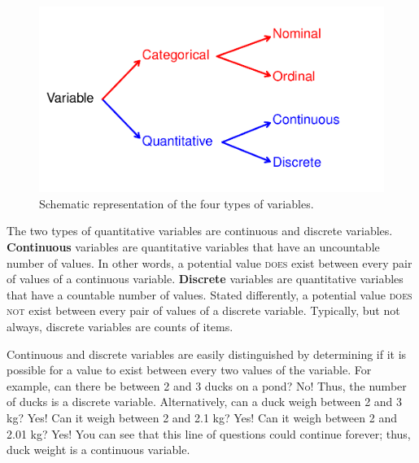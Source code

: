 \documentclass[10pt,openany]{book}\usepackage[]{graphicx}\usepackage[]{color}
\newenvironment{knitrout}{}{} %
\begin{document}
\begin{knitrout}
\color{fgcolor}\begin{figure}[hbtp]

{\centering \includegraphics[width=.7\linewidth]{Figs/VarTypes-1} 

}

\caption[Schematic representation of the four types of variables]{Schematic representation of the four types of variables.}\label{fig:VarTypes}
\end{figure}


\end{knitrout}
\vspace{9pt} %

The two types of quantitative variables are continuous and discrete variables.  \textbf{Continuous} variables are quantitative variables that have an uncountable number of values.  In other words, a potential value \textsc{does} exist between every pair of values of a continuous variable.  \textbf{Discrete} variables are quantitative variables that have a countable number of values.  Stated differently, a potential value \textsc{does not} exist between every pair of values of a discrete variable.  Typically, but not always, discrete variables are counts of items.

Continuous and discrete variables are easily distinguished by determining if it is possible for a value to exist between every two values of the variable.  For example, can there be between 2 and 3 ducks on a pond?  No!  Thus, the number of ducks is a discrete variable.  Alternatively, can a duck weigh between 2 and 3 kg?  Yes!  Can it weigh between 2 and 2.1 kg?  Yes!  Can it weigh between 2 and 2.01 kg?  Yes!  You can see that this line of questions could continue forever; thus, duck weight is a continuous variable.

\end{document}
